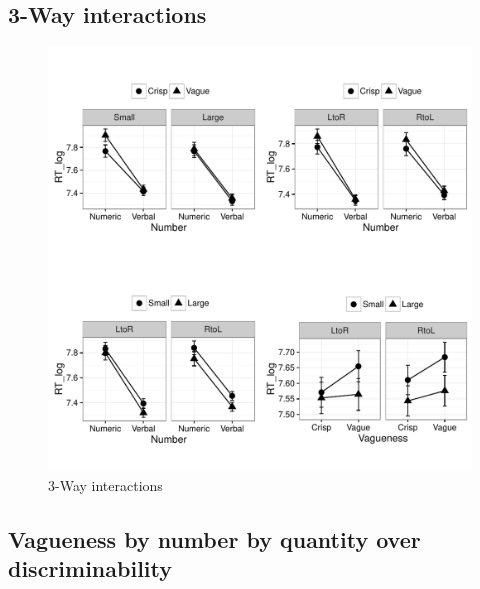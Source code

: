 \documentclass[a4paper,12pt,twoside]{article}\usepackage[]{graphicx}\usepackage[]{color}
\makeatletter
\def\maxwidth{ %
  \ifdim\Gin@nat@width>\linewidth
    \linewidth
  \else
    \Gin@nat@width
  \fi
}
\newenvironment{knitrout}{}{} %
\makeatother
\begin{document}
\clearpage
\subsection{3-Way interactions}


\begin{knitrout}\scriptsize
{}\color{fgcolor}\begin{figure}[hbtp]

{\centering \includegraphics[width=\maxwidth]{figure/graphics-plot3way-1} 

}

\caption[3-Way interactions]{3-Way interactions}\label{fig:plot3way}
\end{figure}


\end{knitrout}

\clearpage
\subsection{Vagueness by number by quantity over discriminability}
\end{document}
